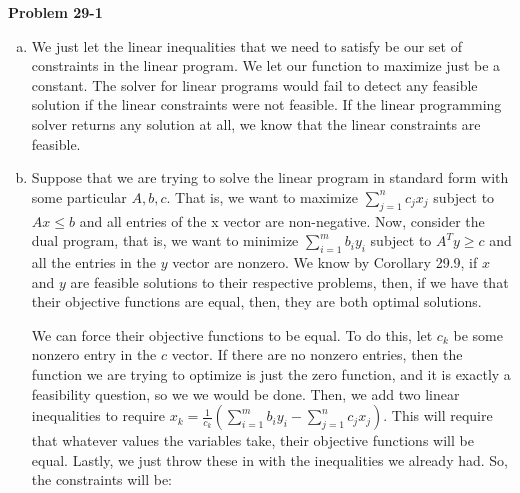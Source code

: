 \documentclass{article}
\begin{document}
\noindent\textbf{Problem 29-1}\\

\begin{enumerate}[a.]
\item
We just let the linear inequalities that we need to satisfy be our set of constraints in the linear program. We let our function to maximize just be a constant. The solver for linear programs would fail to detect any feasible solution if the linear constraints were not feasible. If the linear programming solver returns any solution at all, we know that the linear constraints are feasible. 
\item
\begin{comment}
Take the constraints of the linear program together with the constraints of its dual. Together, if these constraints are satisfied, then there must be an optimal solution which is equal to any solution of all the constraints. This approach assumes that the linear feasibility tester doesn't just say whether or not the linear inequalities are all simultaneously satisfiable, but actually gives an assignment to the variables that satisfies them. We can see that if we can get all of these inequalities simultaneously satisfied, then we must have that our solution is optimal by the duality theorem, which says that the optimal solution to the linear program is also an optimal solution to the dual of the linear program.
\end{comment}
Suppose that we are trying to solve the linear program in standard form with some particular $A,b,c$. That is, we want to maximize $\sum_{j=1}^n c_j x_j$ subject to $Ax \le b$ and all entries of the x vector are non-negative. Now, consider the dual program, that is, we want to minimize $\sum_{i=1}^m b_i y_i$ subject to $A^T y \ge c$ and all the entries in the $y$ vector are nonzero. We know by Corollary 29.9, if $x$ and $y$ are feasible solutions to their respective problems, then, if we have that their objective functions are equal, then, they are both optimal solutions. 

We can force their objective functions to be equal. To do this, let $c_k$ be some nonzero entry in the $c$ vector. If there are no nonzero entries, then the function we are trying to optimize is just the zero function, and it is exactly a feasibility question, so we we would be done. Then, we add two linear inequalities to require $x_k = \frac{1}{c_k} \left(\sum_{i=1}^m b_i y_i - \sum_{j=1}^n c_j x_j\right)$. This will require that whatever values the variables take, their objective functions will be equal. Lastly, we just throw these in with the inequalities we already had. So, the constraints will be:



\end{enumerate}
\end{document}
